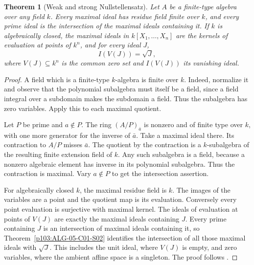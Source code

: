 \documentclass[11pt,oneside,openany]{book}
\newtheorem{theorem}{Theorem}[chapter]
\theoremstyle{definition}
\theoremstyle{remark}
\begin{document}
\begin{theorem}[Weak and strong Nullstellensatz]\label{p103:ALG-05-C01-S05}
Let \(A\) be a finite-type algebra over any field \(k\). Every maximal ideal has residue field finite over \(k\), and every prime ideal is the intersection of the maximal ideals containing it. If \(k\) is algebraically closed, the maximal ideals in \(k[X_1,\ldots,X_n]\) are the kernels of evaluation at points of \(k^n\), and for every ideal \(J\),
\[
 I(V(J))=\sqrt J ,
\]
where \(V(J)\subseteq k^n\) is the common zero set and \(I(V(J))\) its vanishing ideal.
\end{theorem}
\begin{proof}
A field which is a finite-type \(k\)-algebra is finite over \(k\). Indeed, normalize it and observe that the polynomial subalgebra must itself be a field, since a field integral over a subdomain makes the subdomain a field. Thus the subalgebra has zero variables. Apply this to each maximal quotient.

Let \(P\) be prime and \(a\notin P\). The ring \((A/P)_{\bar a}\) is nonzero and of finite type over \(k\), with one more generator for the inverse of \(\bar a\). Take a maximal ideal there. Its contraction to \(A/P\) misses \(\bar a\). The quotient by the contraction is a \(k\)-subalgebra of the resulting finite extension field of \(k\). Any such subalgebra is a field, because a nonzero algebraic element has inverse in its polynomial subalgebra. Thus the contraction is maximal. Vary \(a\notin P\) to get the intersection assertion.

For algebraically closed \(k\), the maximal residue field is \(k\). The images of the variables are a point and the quotient map is its evaluation. Conversely every point evaluation is surjective with maximal kernel. The ideals of evaluation at points of \(V(J)\) are exactly the maximal ideals containing \(J\). Every prime containing \(J\) is an intersection of maximal ideals containing it, so Theorem~\ref{p103:ALG-05-C01-S02} identifies the intersection of all those maximal ideals with \(\sqrt J\). This includes the unit ideal, where \(V(J)\) is empty, and zero variables, where the ambient affine space is a singleton. The proof follows \cite[Theorem 1.6 and Corollary 13.12]{eisenbud}.
\end{proof}
\end{document}
